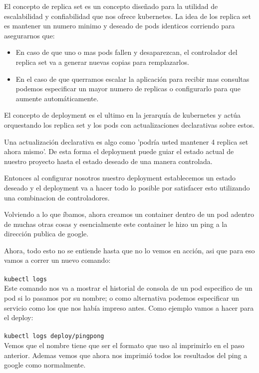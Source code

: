 \documentclass[11pt]{article} %
\begin{document}
El concepto de replica set es un concepto diseñado para la utilidad de escalabilidad y confiabilidad que nos ofrece kubernetes. La idea de los replica set es mantener un numero minimo y deseado de pods identicos corriendo para asegurarnos que:
\begin{itemize}
    
	\item    
    En caso de que uno o mas pods fallen y desaparezcan, el controlador del replica set va a generar nuevas copias para remplazarlos.
    
	\item	
	En el caso de que querramos escalar la aplicación para recibir mas consultas podemos especificar un mayor numero de replicas o configurarlo para que aumente automáticamente.
\end{itemize}


El concepto de deployment es el ultimo en la jerarquía de kubernetes y actúa orquestando los replica set y los pods con actualizaciones declarativas sobre estos.

Una actualización declarativa es algo como 'podría usted mantener 4 replica set ahora mismo'. De esta forma el deployment puede guiar el estado actual de nuestro proyecto hasta el estado deseado de una manera controlada.

Entonces al configurar nosotros nuestro deployment establecemos un estado deseado y el deployment va a hacer todo lo posible por satisfacer esto utilizando una combinacion de controladores.

Volviendo a lo que íbamos, ahora creamos un container dentro de un pod adentro de muchas otras cosas y esencialmente este container le hizo un ping a la dirección publica de google.

Ahora, todo esto no se entiende hasta que no lo vemos en acción, asi que para eso vamos a correr un nuevo comando:\\ \\
    \texttt{kubectl logs} \\ 

Este comando nos va a mostrar el historial de consola de un pod especifico de un pod si lo pasamos por su nombre; o como alternativa podemos especificar un servicio como los que nos había impreso antes. Como ejemplo vamos a hacer para el deploy: \\ \\
    \texttt{kubectl logs deploy/pingpong} \\

Vemos que el nombre tiene que ser el formato que uso al imprimirlo en el paso anterior. Ademas vemos que ahora nos imprimió todos los resultados del ping a google como normalmente.\\
\end{document}
